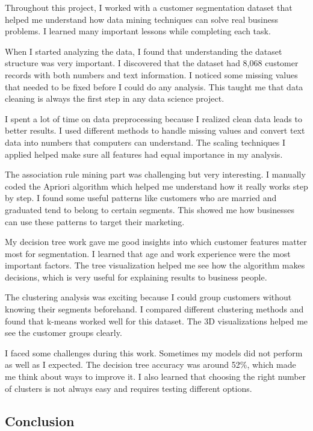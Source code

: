 \documentclass[12pt,a4paper]{article}
\begin{document}
Throughout this project, I worked with a customer segmentation dataset that helped me understand how data mining techniques can solve real business problems. I learned many important lessons while completing each task.

When I started analyzing the data, I found that understanding the dataset structure was very important. I discovered that the dataset had 8,068 customer records with both numbers and text information. I noticed some missing values that needed to be fixed before I could do any analysis. This taught me that data cleaning is always the first step in any data science project.

I spent a lot of time on data preprocessing because I realized clean data leads to better results. I used different methods to handle missing values and convert text data into numbers that computers can understand. The scaling techniques I applied helped make sure all features had equal importance in my analysis.

The association rule mining part was challenging but very interesting. I manually coded the Apriori algorithm which helped me understand how it really works step by step. I found some useful patterns like customers who are married and graduated tend to belong to certain segments. This showed me how businesses can use these patterns to target their marketing.

My decision tree work gave me good insights into which customer features matter most for segmentation. I learned that age and work experience were the most important factors. The tree visualization helped me see how the algorithm makes decisions, which is very useful for explaining results to business people.

The clustering analysis was exciting because I could group customers without knowing their segments beforehand. I compared different clustering methods and found that k-means worked well for this dataset. The 3D visualizations helped me see the customer groups clearly.

I faced some challenges during this work. Sometimes my models did not perform as well as I expected. The decision tree accuracy was around 52\%, which made me think about ways to improve it. I also learned that choosing the right number of clusters is not always easy and requires testing different options.

\subsection{Conclusion}
\end{document}
